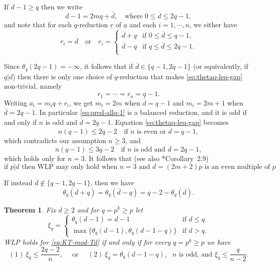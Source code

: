 \documentclass[11pt,reqno]{amsart}
\newcommand{\ol}[1]{\overline{#1}}
\newcommand{\ul}[1]{\underline{#1}}
\newtheorem{theorem}{Theorem}[section]
\theoremstyle{definition}
\theoremstyle{remark}
\numberwithin{equation}{section}
\begin{document}
If $d-1 \geq q$ then we write
\begin{equation}\label{eq:d-1=2mq+dbar} 
d-1 = 2mq+\ol{d},\quad\text{where }0\leq \ol{d}\leq 2q-1,
\end{equation}
and note that for each $q$-reduction $\ul{r}$ of $\ul{a}$ and each $i=1,\cdots,n$, we either have
\begin{equation}\label{eq:possible-aibar}
    r_i = \ol{d} \quad\text{or}\quad r_i = \begin{cases}
        \ol{d}+q & \text{if }0\leq\ol{d}\leq q-1, \\
        \ol{d}-q & \text{if }q\leq\ol{d}\leq 2q-1. \\
    \end{cases}
\end{equation}

Since $\theta_q(2q-1)=-\infty$, it follows that if $\ol{d}\in\{q-1,2q-1\}$ (or equivalently, if $q|d$) then there is only one choice of $q$-reduction that makes \eqref{eq:thetaq-leq-gap} non-trivial, namely
\begin{equation}\label{eq:qred-allq-1}
    r_1=\cdots=r_n=q-1.
\end{equation}
Writing $a_i = m_iq+r_i$, we get $m_i=2m$ when $\ol{d}=q-1$ and $m_i = 2m+1$ when $\ol{d}=2q-1$. In particular \eqref{eq:qred-allq-1} is a balanced reduction, and it is odd if and only if $n$ is odd and $\ol{d}=2q-1$. Equation \eqref{eq:thetaq-leq-gap} becomes
\[n(q-1)\leq 2q-2\quad\text{if $n$ is even or $\ol{d}=q-1$},\]
which contradicts our assumption $n\geq 3$, and
\[n(q-1)\leq 3q-2\quad\text{if $n$ is odd and $\ol{d}=2q-1$},\]
which holds only for $n=3$. It follows that (see also \cite{bre-kai}*{Corollary~2.9})
\begin{equation}\label{eq:WLP-p-divides-d}
\text{if $p|d$ then WLP may only hold when $n=3$ and $d=(2m+2)p$ is an even multiple of $p$}.
\end{equation}

If instead $\ol{d}\not\in\{q-1,2q-1\}$, then we have
\begin{equation}\label{eq:theta-dbar-pm-q}
\theta_q(\ol{d}+q) = \theta_q(\ol{d}-q) = q-2-\theta_q(\ol{d}).
\end{equation}

\begin{theorem}\label{thm:WLP-constant-ai}
    Fix $d\geq 2$ and for $q=p^k\geq p$ let
    \[\xi_q = \begin{cases}
        \theta_q(d-1)=d-1 & \text{if }d\leq q \\
        \max\{\theta_q(d-1),\theta_q(d-1-q)\} & \text{if }d>q.
    \end{cases}\]
    WLP holds for \eqref{eq:KT-mod-Td} if and only if for every $q=p^k\geq p$ we have
    \begin{equation}\label{eq:conds-xiq}
    (1)\ \xi_q \leq\frac{2q-2}{n},\quad\text{ or }\quad(2)\
        \xi_q=\theta_q(d-1-q),\text{ $n$ is odd, and }\xi_q \leq\frac{q}{n-2}.
    \end{equation}
\end{theorem}
\end{document}
